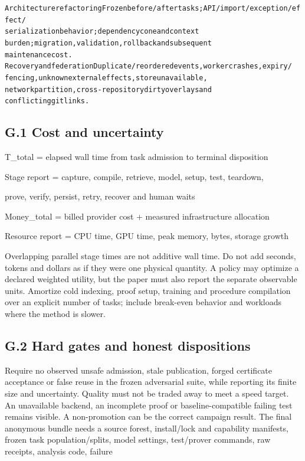 \begin{alltt}
Architecture refactoring                     Frozen before/after tasks; API/import/exception/effect/
                                             serialization behavior; dependency cone and context
                                             burden; migration, validation, rollback and subsequent
                                             maintenance cost.
Recovery and federation                      Duplicate/reordered events, worker crashes, expiry/
                                             fencing, unknown external effects, store unavailable,
                                             network partition, cross-repository dirty overlays and
                                             conflicting gitlinks.
\end{alltt}\endgroup


\subsection*{G.1 Cost and uncertainty}

\noindent T\_total = elapsed wall time from task admission to terminal disposition\par
\noindent Stage report = capture, compile, retrieve, model, setup, test, teardown,\par
\noindent prove, verify, persist, retry, recover and human waits\par
\noindent Money\_total = billed provider cost + measured infrastructure allocation\par
\noindent Resource report = CPU time, GPU time, peak memory, bytes, storage growth\par

Overlapping parallel stage times are not additive wall time. Do not add seconds, tokens and dollars as
if they were one physical quantity. A policy may optimize a declared weighted utility, but the paper
must also report the separate observable units. Amortize cold indexing, proof setup, training and
procedure compilation over an explicit number of tasks; include break-even behavior and workloads
where the method is slower.

\subsection*{G.2 Hard gates and honest dispositions}

Require no observed unsafe admission, stale publication, forged certificate acceptance or false reuse in
the frozen adversarial suite, while reporting its finite size and uncertainty. Quality must not be traded
away to meet a speed target. An unavailable backend, an incomplete proof or baseline-compatible
failing test remains visible. A non-promotion can be the correct campaign result.
The final anonymous bundle needs a source forest, install/lock and capability manifests, frozen
task population/splits, model settings, test/prover commands, raw receipts, analysis code, failure


